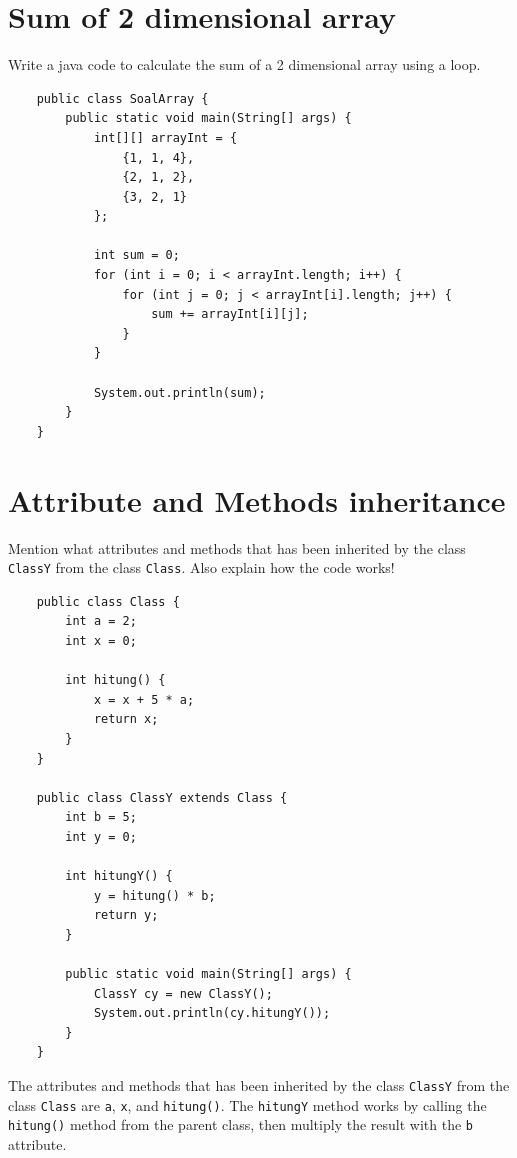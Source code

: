\documentclass[12pt,titlepage]{article}
\begin{document}
\section{Sum of 2 dimensional array}
Write a java code to calculate the sum of a 2 dimensional array using a loop.

\begin{verbatim}
    public class SoalArray {
        public static void main(String[] args) {
            int[][] arrayInt = {
                {1, 1, 4},
                {2, 1, 2},
                {3, 2, 1}
            };

            int sum = 0;
            for (int i = 0; i < arrayInt.length; i++) {
                for (int j = 0; j < arrayInt[i].length; j++) {
                    sum += arrayInt[i][j];
                }
            }

            System.out.println(sum);
        }
    }
\end{verbatim}

\pagebreak

\section{Attribute and Methods inheritance}
Mention what attributes and methods that has been inherited by the class \texttt{ClassY} from the class \texttt{Class}.
Also explain how the code works!

\begin{verbatim}
    public class Class {
        int a = 2;
        int x = 0;

        int hitung() {
            x = x + 5 * a;
            return x;
        }
    }

    public class ClassY extends Class {
        int b = 5;
        int y = 0;

        int hitungY() {
            y = hitung() * b;
            return y;
        }

        public static void main(String[] args) {
            ClassY cy = new ClassY();
            System.out.println(cy.hitungY());
        }
    }
\end{verbatim}

The attributes and methods that has been inherited by the class \texttt{ClassY} from the class \texttt{Class} are \texttt{a}, \texttt{x}, and \texttt{hitung()}.
The \texttt{hitungY} method works by calling the \texttt{hitung()} method from the parent class, then multiply the result with the \texttt{b} attribute.
\end{document}

